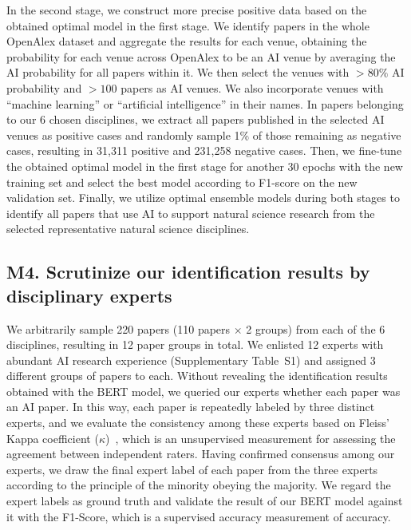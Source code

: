 In the second stage, we construct more precise positive data based on the obtained optimal model in the first stage.
We identify papers in the whole OpenAlex dataset and aggregate the results for each venue, obtaining the probability for each venue across OpenAlex to be an AI venue by averaging the AI probability for all papers within it.
We then select the venues with $>80\%$ AI probability and $>100$ papers as AI venues.
We also incorporate venues with “machine learning” or “artificial intelligence” in their names.
In papers belonging to our 6 chosen disciplines, we extract all papers published in the selected AI venues as positive cases and randomly sample 1\% of those remaining as negative cases, resulting in 31,311 positive and 231,258 negative cases.
Then, we fine-tune the obtained optimal model in the first stage for another 30 epochs with the new training set and select the best model according to F1-score on the new validation set.
Finally, we utilize optimal ensemble models during both stages to identify all papers that use AI to support natural science research from the selected representative natural science disciplines.


\subsection*{M4. Scrutinize our identification results by disciplinary experts}
We arbitrarily sample 220 papers (110 papers $\times$ 2 groups) from each of the 6 disciplines, resulting in 12 paper groups in total.
We enlisted 12 experts with abundant AI research experience (Supplementary Table~S1) and assigned 3 different groups of papers to each.
Without revealing the identification results obtained with the BERT model, we queried our experts whether each paper was an AI paper.
In this way, each paper is repeatedly labeled by three distinct experts, and we evaluate the consistency among these experts based on Fleiss’ Kappa coefficient ($\kappa$)~\supercite{landis1977measurement,fleiss1971measuring}, which is an unsupervised measurement for assessing the agreement between independent raters.
Having confirmed consensus among our experts, we draw the final expert label of each paper from the three experts according to the principle of the minority obeying the majority. We regard the expert labels as ground truth and validate the result of our BERT model against it with the F1-Score, which is a supervised accuracy measurement of accuracy.

